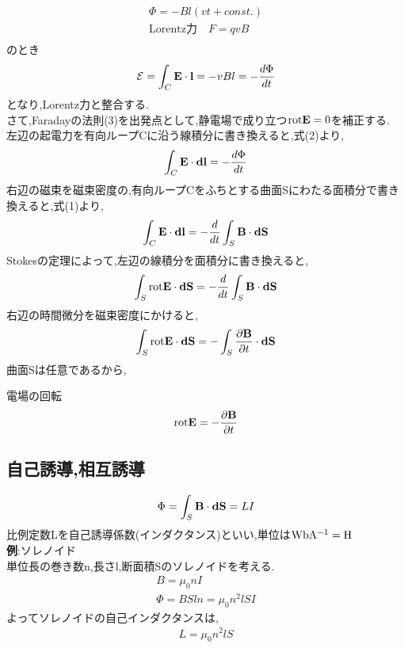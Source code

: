 \documentclass[../main]{subfiles}
\begin{document}
\begin{eqnarray*}
\Phi = - Bl(vt+const.) \\
\mbox{Lorentz力} \quad F = qvB \\
\end{eqnarray*}
のとき
\begin{eqnarray*}
\mathcal{E} = \int_{C} {\bf E} \cdot {\bf l} = - vBl = -\frac{d \Phi}{dt}
\end{eqnarray*}
となり,Lorentz力と整合する.
\\
さて,Faradayの法則(3)を出発点として,静電場で成り立つ${\rm rot}{\bf E}=0$を補正する. \\
左辺の起電力を有向ループCに沿う線積分に書き換えると,式(2)より,
\begin{eqnarray*}
\int_{C} {\bf E} \cdot {\bf dl} = -\frac{d \Phi}{dt}
\end{eqnarray*}
右辺の磁束を磁束密度の,有向ループCをふちとする曲面Sにわたる面積分で書き換えると,式(1)より,
\begin{eqnarray*}
\int_{C} {\bf E} \cdot {\bf dl} = -\frac{d}{dt} \int_{S} {\bf B} \cdot {\bf dS}
\end{eqnarray*}
Stokesの定理によって,左辺の線積分を面積分に書き換えると,
\begin{eqnarray*}
\int_{S} {\rm rot}{\bf E} \cdot {\bf dS} = -\frac{d}{dt} \int_{S} {\bf B} \cdot {\bf dS}
\end{eqnarray*}
右辺の時間微分を磁束密度にかけると,
\begin{eqnarray*}
\int_{S} {\rm rot}{\bf E} \cdot {\bf dS} = -\int_{S} \frac{\partial {\bf B} }{\partial t} \cdot {\bf dS}
\end{eqnarray*}
曲面Sは任意であるから,

\begin{itembox}[c]{電場の回転}
\begin{eqnarray*}
{\rm rot}{\bf E} = -\frac{\partial {\bf B} }{\partial t}
\end{eqnarray*}
\end{itembox}


\subsection{自己誘導,相互誘導}
\begin{eqnarray*}
\Phi = \int_{S} {\bf B} \cdot {\bf dS} = LI
\end{eqnarray*}
比例定数Lを自己誘導係数(インダクタンス)といい,単位は${\rm WbA^{-1}=H}$ \\
{\bf 例}:ソレノイド \\
単位長の巻き数n,長さl,断面積Sのソレノイドを考える.
\begin{eqnarray*}
B = \mu_0 n I \\
\Phi = BSln = \mu_0 n^2 l S I 
\end{eqnarray*}
よってソレノイドの自己インダクタンスは,
\begin{eqnarray*}
L=\mu_0 n^2 l S
\end{eqnarray*}
\\
\end{document}
